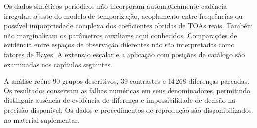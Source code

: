 Os dados sintéticos periódicos não incorporam automaticamente cadência
irregular, ajuste do modelo de temporização, acoplamento entre frequências
ou possível impropriedade complexa dos coeficientes obtidos de TOAs reais.
Também não marginalizam os parâmetros auxiliares aqui conhecidos.
Comparações de evidência entre espaços de observação diferentes não são
interpretadas como fatores de Bayes. A extensão escalar e a aplicação com posições de catálogo são examinadas nos capítulos seguintes.

A análise reúne 90 grupos descritivos, 39 contrastes e 14\,268 diferenças pareadas. Os resultados conservam as falhas numéricas em seus denominadores, permitindo distinguir ausência de evidência de diferença e impossibilidade de decisão na precisão disponível. Os dados e procedimentos de reprodução são disponibilizados no material suplementar.
